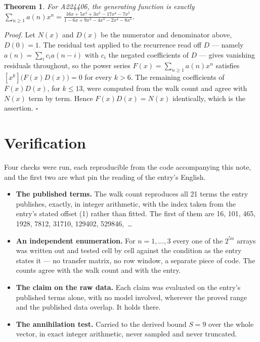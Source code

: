 \documentclass[11pt]{article}
\newtheorem{theorem}{Theorem}
\theoremstyle{definition}
\begin{document}
\begin{theorem} For A224406, the generating function is exactly $\sum_{n\ge 1} a(n)x^n = \frac{16x + 5x^{2} + 3x^{3} - 17x^{4} - 7x^{5}}{1 - 6x + 9x^{2} - 4x^{3} - 2x^{4} - 8x^{5}}$.\end{theorem}

{\itshape Proof.} Let $N(x)$ and $D(x)$ be the numerator and denominator above, $D(0)=1$. The residual test applied to the recurrence read off $D$ --- namely $a(n) = \sum_i c_i a(n-i)$ with $c_i$ the negated coefficients of $D$ --- gives vanishing residuals throughout, so the power series $F(x)=\sum_{n\ge 1}a(n)x^n$ satisfies $[x^k]\bigl(F(x)D(x)\bigr) = 0$ for every $k > 6$. The remaining coefficients of $F(x)D(x)$, for $k \le 13$, were computed from the walk count and agree with $N(x)$ term by term. Hence $F(x)D(x) = N(x)$ identically, which is the assertion. $\square$

\section{Verification}

Four checks were run, each reproducible from the code accompanying this note, and the first two are what pin the reading of the entry's English.

\begin{itemize}

\item {\bfseries The published terms.} The walk count reproduces all 21 terms the entry publishes, exactly, in integer arithmetic, with the index taken from the entry's stated offset (1) rather than fitted. The first of them are 16, 101, 465, 1928, 7812, 31710, 129402, 529846,~\dots

\item {\bfseries An independent enumeration.} For $n = 1,\dots,3$ every one of the $2^{5n}$ arrays was written out and tested cell by cell against the condition as the entry states it --- no transfer matrix, no row window, a separate piece of code. The counts agree with the walk count and with the entry.

\item {\bfseries The claim on the raw data.} Each claim was evaluated on the entry's published terms alone, with no model involved, wherever the proved range and the published data overlap. It holds there.

\item {\bfseries The annihilation test.} Carried to the derived bound $S = 9$ over the whole vector, in exact integer arithmetic, never sampled and never truncated.

\end{itemize}
\end{document}
